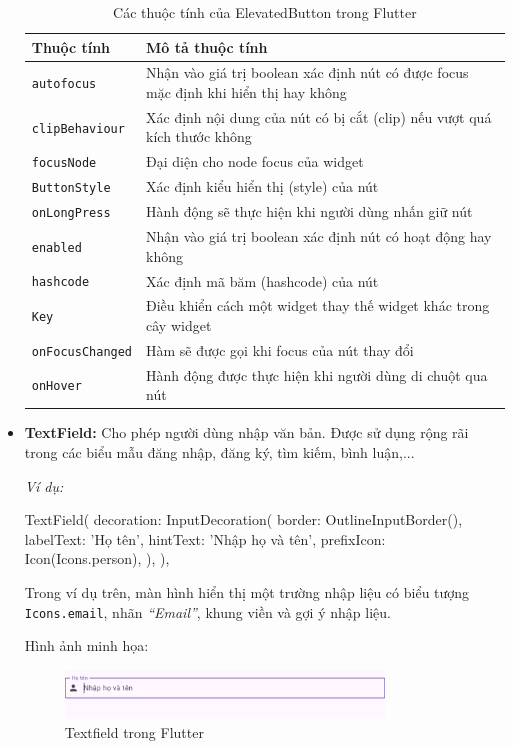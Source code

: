 \documentclass[../DoAn.tex]{subfiles}
\numberwithin{figure}{chapter}
\begin{document}
\begin{itemize}
\begin{table}[H]
\centering
\begin{tabular}{|>{\centering\arraybackslash}p{4cm}|>{\centering\arraybackslash}p{9.5cm}|}
\hline
\textbf{Thuộc tính} & \textbf{Mô tả thuộc tính} \\ \hline
\texttt{autofocus} & Nhận vào giá trị boolean xác định nút có được focus mặc định khi hiển thị hay không \\ \hline
\texttt{clipBehaviour} & Xác định nội dung của nút có bị cắt (clip) nếu vượt quá kích thước không \\ \hline
\texttt{focusNode} & Đại diện cho node focus của widget \\ \hline
\texttt{ButtonStyle} & Xác định kiểu hiển thị (style) của nút \\ \hline
\texttt{onLongPress} & Hành động sẽ thực hiện khi người dùng nhấn giữ nút \\ \hline
\texttt{enabled} & Nhận vào giá trị boolean xác định nút có hoạt động hay không \\ \hline
\texttt{hashcode} & Xác định mã băm (hashcode) của nút \\ \hline
\texttt{Key} & Điều khiển cách một widget thay thế widget khác trong cây widget \\ \hline
\texttt{onFocusChanged} & Hàm sẽ được gọi khi focus của nút thay đổi \\ \hline
\texttt{onHover} & Hành động được thực hiện khi người dùng di chuột qua nút \\ \hline
\end{tabular}
\caption{Các thuộc tính của ElevatedButton trong Flutter}
\label{tab:elevated_button_properties}
\end{table}

\item \textbf{TextField:} Cho phép người dùng nhập văn bản. Được sử dụng rộng rãi trong các biểu mẫu đăng nhập, đăng ký, tìm kiếm, bình luận,...

\textit{Ví dụ:}
\begin{myverbatim}
TextField(
  decoration: InputDecoration(
    border: OutlineInputBorder(),
    labelText: 'Họ tên',
    hintText: 'Nhập họ và tên',
    prefixIcon: Icon(Icons.person),
  ),
),
\end{myverbatim}

Trong ví dụ trên, màn hình hiển thị một trường nhập liệu có biểu tượng \texttt{Icons.email}, nhãn \textit{“Email”}, khung viền và gợi ý nhập liệu.

Hình ảnh minh họa:
\begin{figure}[H]
    \centering
    \includegraphics[width=0.8\textwidth]{Hinhve/Chuong5/textfieldWidget.png}
    \caption{Textfield trong Flutter}
    \label{fig:textfieldwidget}
\end{figure}


\end{itemize}
\end{document}
